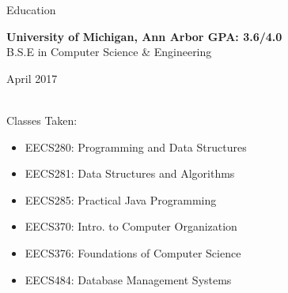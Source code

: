 \documentclass{resume} %
\begin{document}
\bigskip


\begin{rSection}{Education}

{\bf University of Michigan, Ann Arbor \hfill GPA: 3.6/4.0 \\}%
B.S.E in Computer Science \& Engineering \hfill \begin{em} April 2017 \end{em}\\
Classes Taken:
\vspace{-3mm}
\begin{multicols}{2}
\begin{itemize}[noitemsep,nolistsep]
    \item EECS280: Programming and Data Structures
    \item EECS281: Data Structures and Algorithms
    \item EECS285: Practical Java Programming
    \item EECS370: Intro. to Computer Organization
    \item EECS376: Foundations of Computer Science
    \item EECS484: Database Management Systems
\end{itemize}
\end{multicols}
\vspace{-4mm}

\end{rSection}

\end{document}
